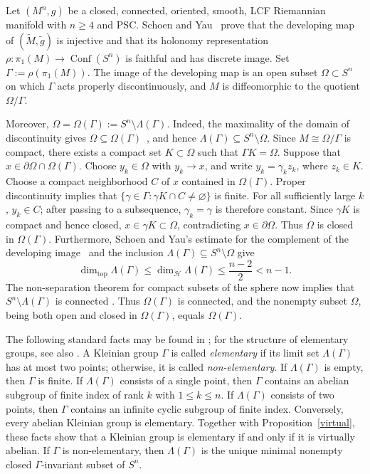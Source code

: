 \documentclass[12pt,oneside,a4paper]{article}
\theoremstyle{mytheorem}
\theoremstyle{remark}
\theoremstyle{definition}
\begin{document}
Let \((M^n,g)\) be a closed, connected, oriented, smooth, LCF Riemannian
manifold with \(n\geq4\) and PSC. Schoen and
Yau~\cite[Theorem~4.5]{zbMATH04075988} prove that the developing map of
\((\widetilde M,\widetilde g)\) is injective and that its holonomy
representation
\(\rho\colon\pi_1(M)\to\operatorname{Conf}(S^n)\)
is faithful and has discrete image. Set \(\Gamma:=\rho(\pi_1(M))\). The image
of the developing map is an open subset \(\Omega\subset S^n\) on which
\(\Gamma\) acts properly discontinuously, and \(M\) is diffeomorphic to the
quotient \(\Omega/\Gamma\).

Moreover, \(\Omega=\Omega(\Gamma):=S^n\setminus\Lambda(\Gamma)\). Indeed,
the maximality of the domain of discontinuity gives
\(\Omega\subseteq\Omega(\Gamma)\)~\cite{zbMATH00195006}, and hence
\(\Lambda(\Gamma)\subseteq S^n\setminus\Omega\). Since
\(M\cong\Omega/\Gamma\) is compact, there exists a compact set
\(K\subset\Omega\) such that \(\Gamma K=\Omega\). Suppose that
\(x\in\partial\Omega\cap\Omega(\Gamma)\). Choose \(y_k\in\Omega\) with
\(y_k\to x\), and write \(y_k=\gamma_kz_k\), where \(z_k\in K\). Choose a
compact neighborhood \(C\) of \(x\) contained in \(\Omega(\Gamma)\). Proper
discontinuity implies that
\(\{\gamma\in\Gamma:\gamma K\cap C\ne\varnothing\}\)
is finite. For all sufficiently large \(k\), \(y_k\in C\); after passing to a
subsequence, \(\gamma_k=\gamma\) is therefore constant. Since \(\gamma K\)
is compact and hence closed, \(x\in\gamma K\subset\Omega\), contradicting
\(x\in\partial\Omega\). Thus \(\Omega\) is closed in \(\Omega(\Gamma)\).
Furthermore, Schoen and Yau's estimate for the complement of the developing
image~\cite[Theorem~4.7]{zbMATH04075988} and the inclusion
\(\Lambda(\Gamma)\subseteq S^n\setminus\Omega\) give
\[
\dim_{\mathrm{top}}\Lambda(\Gamma)
\leq\dim_{\mathcal H}\Lambda(\Gamma)
\leq\frac{n-2}{2}<n-1.
\]
The non-separation theorem for compact subsets of the sphere now implies that
\(S^n\setminus\Lambda(\Gamma)\) is connected
\cite[p.~48, Corollary~1 to Theorem~IV.4]{MR0006493}. Thus
\(\Omega(\Gamma)\) is connected, and the nonempty subset \(\Omega\), being
both open and closed in \(\Omega(\Gamma)\), equals \(\Omega(\Gamma)\).





 The following standard facts may be found in \cite{zbMATH00195006}; for the
 structure of elementary groups, see also
 \cite[\S~5.5, especially Lemma~1 and Theorem~5.5.9]{MR4221225}. A Kleinian
 group $\Gamma$ is called \textit{elementary} if its limit set
 $\Lambda(\Gamma)$ has at most two points; otherwise, it is called
 \textit{non-elementary}. If $\Lambda(\Gamma)$ is empty, then $\Gamma$ is
 finite. If $\Lambda(\Gamma)$ consists of a single point, then $\Gamma$
 contains an abelian subgroup of finite index of rank $k$ with
 $1\leq k \leq n$. If $\Lambda(\Gamma)$ consists of two points, then $\Gamma$ contains an
 infinite cyclic subgroup of finite index. Conversely, every abelian Kleinian
 group is elementary. Together with Proposition~\ref{virtual}, these facts show
 that a Kleinian group is elementary if and only if it is virtually abelian. If
 $\Gamma$ is non-elementary, then $\Lambda(\Gamma)$ is the unique minimal
 nonempty closed \(\Gamma\)-invariant subset of \(S^n\).
 
\end{document}
